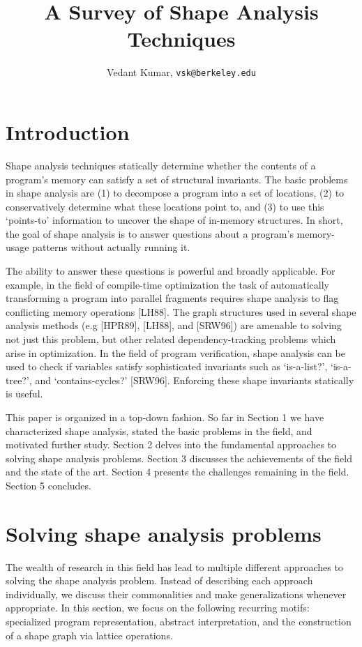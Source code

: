 \documentclass{article}
\title{A Survey of Shape Analysis Techniques}
\author{Vedant Kumar, \texttt{vsk@berkeley.edu}}
\begin{document}
\maketitle

\section{Introduction}

Shape analysis techniques statically determine whether the contents of a
program's memory can satisfy a set of structural invariants. The basic
problems in shape analysis are (1) to decompose a program into a set of
locations, (2) to conservatively determine what these locations point to,
and (3) to use this `points-to' information to uncover the shape of
in-memory structures. In short, the goal of shape analysis is to answer
questions about a program's memory-usage patterns without actually running
it.

The ability to answer these questions is powerful and broadly applicable.
For example, in the field of compile-time optimization the task of
automatically transforming a program into parallel fragments requires shape
analysis to flag conflicting memory operations [LH88]. The graph structures
used in several shape analysis methods (e.g [HPR89], [LH88], and [SRW96])
are amenable to solving not just this problem, but other related
dependency-tracking problems which arise in optimization. In the field of
program verification, shape analysis can be used to check if variables
satisfy sophisticated invariants such as `is-a-list?', `is-a-tree?', and
`contains-cycles?' [SRW96]. Enforcing these shape invariants statically is
useful. 

This paper is organized in a top-down fashion. So far in Section 1 we have
characterized shape analysis, stated the basic problems in the field, and
motivated further study. Section 2 delves into the fundamental approaches to
solving shape analysis problems. Section 3 discusses the achievements of the
field and the state of the art. Section 4 presents the challenges remaining
in the field. Section 5 concludes.

\section{Solving shape analysis problems}

The wealth of research in this field has lead to multiple different
approaches to solving the shape analysis problem. Instead of describing each
approach individually, we discuss their commonalities and make
generalizations whenever appropriate. In this section, we focus on the
following recurring motifs: specialized program representation, abstract
interpretation, and the construction of a shape graph via lattice
operations.
\end{document}
